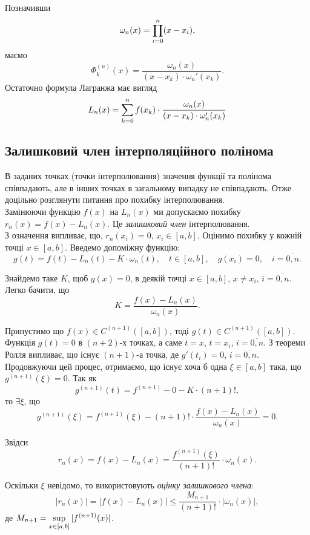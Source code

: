 Позначивши \[\omega_n(x) = \displaystyle\prod\limits_{i=0}^n(x-x_i),\] маємо \[\Phi_k^{(n)}(x) = \dfrac{\omega_n(x)}{(x-x_k)\cdot\omega_n'(x_k)}.\] Остаточно формула Лагранжа має вигляд
\begin{equation}
    \label{eq:6.6}
    L_n(x) = \displaystyle\sum\limits_{k=0}^n f(x_k)\cdot\dfrac{\omega_n(x)}{(x-x_k)\cdot\omega_n'(x_k)}
\end{equation}

\subsection{Залишковий член інтерполяційного полінома}

В заданих точках (точки інтерполювання) значення функції та полінома співпадають, але в інших точках в загальному випадку не співпадають. Отже доцільно розглянути питання про похибку інтерполювання. \\

Замінюючи функцію $f(x)$ на $L_n(x)$ ми допускаємо похибку $r_n(x)=f(x)-L_n(x)$. Це \textit{залишковий член} інтерполювання. \\

З означення випливає, що, $r_n(x_i)=0$, $x_i\in[a,b]$. Оцінимо похибку у кожній точці $x\in[a,b]$. Введемо допоміжну функцію: \[g(t)=f(t)-L_n(t)-K\cdot\omega_n(t), \quad t\in[a,b], \quad g(x_i)=0, \quad i = \overline{0,n}.\]

Знайдемо таке $K$, щоб $g(x)=0$, в деякій точці $x\in[a,b]$, $x\ne x_i$, $i=\overline{0,n}$. Легко бачити, що \[ K = \dfrac{f(x)-L_n(x)}{\omega_n(x)}. \]

Припустимо що $f(x)\in C^{(n+1)}([a,b])$, тоді $g(t)\in C^{(n+1)}([a,b])$. Функція $g(t) = 0$ в $(n+2)$-х точках, а саме $t = x $, $t = x_i$, $i = \overline{0,n}$. З теореми Ролля випливає, що існує $(n+1)$-а точка, де $g'(t_i)=0$, $i = \overline{0,n}$. Продовжуючи цей процес, отримаємо, що існує хоча б одна $\xi \in [a,b]$ така, що $g^{(n+1)} (\xi) = 0$. Так як \[g^{(n+1)}(t) = f^{(n+1)}-0-K\cdot(n+1)!,\] то $\exists \xi$, що \[ g^{(n+1)}(\xi) = f^{(n+1)}(\xi)-(n+1)!\cdot\dfrac{f(x)-L_n(x)}{\omega_n(x)}=0.\]

Звідси
\begin{equation}
    \label{eq:6.7}
    r_n(x) = f(x) - L_n(x) = \dfrac{f^{(n+1)}(\xi)}{(n+1)!}\cdot\omega_n(x).
\end{equation}

Оскільки $\xi$ невідомо, то використовують \textit{оцінку залишкового члена}:
\begin{equation}
    \label{eq:6.8}
    |r_n(x)| = |f(x) - L_n(x)| \le \dfrac{M_{n+1}}{(n+1)!}\cdot|\omega_n(x)|,
\end{equation}
де $M_{n+1} = \displaystyle\sup\limits_{x\in[a,b]} |f^{(n+1)}(x)|$.


